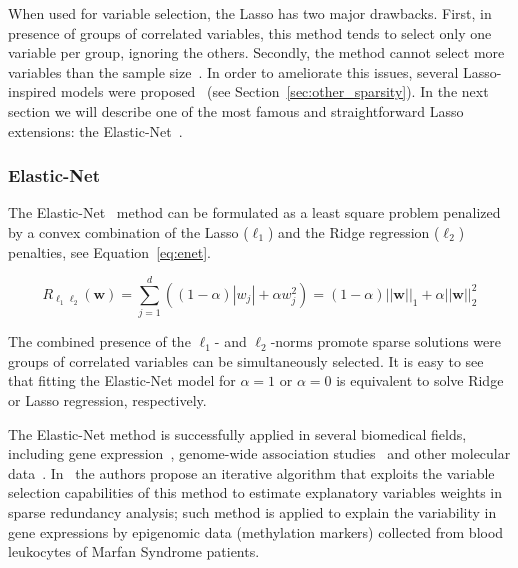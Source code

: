 			When used for variable selection, the Lasso has two major drawbacks. First, in presence of groups of correlated variables, this method tends to select only one variable per group, ignoring the others. Secondly, the method cannot select more variables than the sample size~\cite{waldmann2013evaluation, de2009regularized}. In order to ameliorate this issues, several Lasso-inspired models were proposed~\cite{meinshausen2010stability, hoggart2008simultaneous, zou2006adaptive} (see Section~\ref{sec:other_sparsity}). In the next section we will describe one of the most famous and straightforward Lasso extensions: the Elastic-Net~\cite{zou2005regularization}.




			\subsubsection{Elastic-Net}
			The Elastic-Net~\cite{de2009elastic, zou2005regularization} method can be formulated as a least square problem penalized by a convex combination of the Lasso ($\ell_1$) and the Ridge regression ($\ell_2$) penalties, see Equation~\eqref{eq:enet}.

			\begin{equation}\label{eq:enet}
			  R_{\mbox{$\ell_1\ell_2$}}(\bm{w}) = \sum_{j=1}^d ((1-\alpha) |w_j| + \alpha w_j^2) = (1-\alpha)||\bm{w}||_1 + \alpha||\bm{w}||_2^2
			\end{equation}

			The combined presence of the $\ell_1$- and $\ell_2$-norms promote sparse solutions were groups of correlated variables can be simultaneously selected. It is easy to see that fitting the Elastic-Net model for $\alpha=1$ or $\alpha=0$ is equivalent to solve Ridge or Lasso regression, respectively.

			The Elastic-Net method is successfully applied in several biomedical fields, including gene expression~\cite{jacob2015robust, de2009regularized}, genome-wide association studies~\cite{waldmann2013evaluation} and other molecular data~\cite{aben2016tandem, jacob2015robust}. In~\cite{csala2017sparse} the authors propose an iterative algorithm that exploits the variable selection capabilities of this method to estimate explanatory variables weights  in sparse redundancy analysis; such method is applied to explain the variability in gene expressions by epigenomic data (\ie methylation markers) collected from blood leukocytes of Marfan Syndrome patients.


